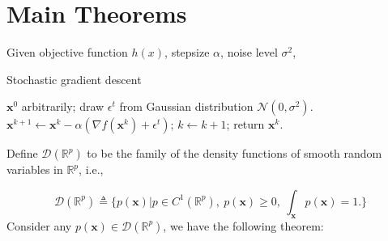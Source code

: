 \documentclass[preprint,12pt,3p]{elsarticle}
\newcommand{\bx}{\mathbf{x}}
\newcommand{\R}{\mathbb{R}}
\newcommand{\D}{\mathscr{D}}
\newcommand{\N}{\mathscr{N}}
\begin{document}
\section{Main Theorems}

\begin{algorithm}
{\small
Given objective function $h(x)$, stepsize $\alpha$, noise level $\sigma^2$,
\begin{algorithmic}\caption{Stochastic gradient descent}\label{Alg:SGD}
 $ \bx^0$ arbitrarily;
\STATE draw $\epsilon^t$ from Gaussian distribution $\N(0, \sigma^2)$.
\STATE
$\bx^{k+1} \gets \bx^k - \alpha(\nabla f(\bx^k) + \epsilon^t)$;
\STATE $k\gets k+1$;
\ENDWHILE
\STATE return $\bx^k$.
\end{algorithmic}}
\end{algorithm}

Define $\D(\R^p)$ to be the family of the density functions of smooth random variables in $\R^p$, i.e.,

\begin{equation}
\D(\R^p)\triangleq \{p(\bx)\Big| p\in C^1(\R^p),~p(\bx) \geq 0,~ \int_\bx p(\bx) = 1.\}
\end{equation}
Consider any $p(\bx)\in \D(\R^p)$, we have the following theorem:
\end{document}

